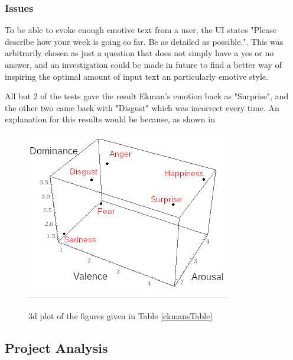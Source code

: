 \subsubsection{Issues}

To be able to evoke enough emotive text from a user, the UI states "Please describe how your week is going so far. Be as detailed as possible.". This was arbitrarily chosen as just a question that does not simply have a yes or no answer, and an investigation could be made in future to find a better way of inspiring the optimal amount of input text an particularly emotive style.

All but 2 of the tests gave the result Ekman's emotion back as "Surprise", and the other two came back with "Disgust" which was incorrect every time. An explanation for this results would be because, as shown in 

\begin{figure}[ht]
\caption{3d plot of the figures given in Table \ref{ekmansTable}}
\centering
\includegraphics[scale=2]{litImgs/Ekmans3d.png}
\label{ekmans:graph}
\end{figure}

\subsection{Project Analysis}


